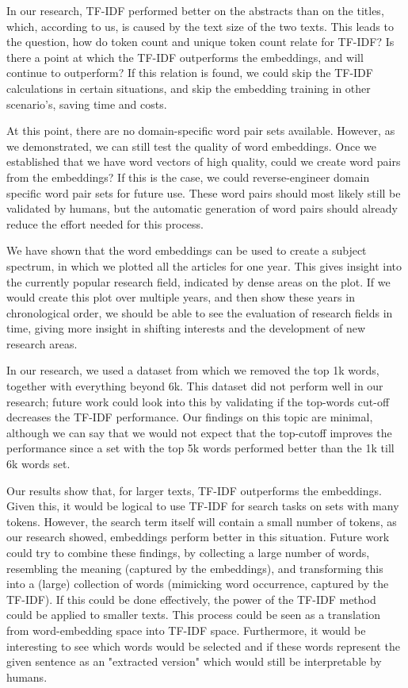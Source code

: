\documentclass[../../Thesis.tex]{subfiles}
\begin{document}
In our research, TF-IDF performed better on the abstracts than on the titles, which, according to us, is caused by the text size of the two texts. This leads to the question, how do token count and unique token count relate for TF-IDF? Is there a point at which the TF-IDF outperforms the embeddings, and will continue to outperform? If this relation is found,  we could skip the TF-IDF calculations in certain situations, and skip the embedding training in other scenario's, saving time and costs.

At this point, there are no domain-specific word pair sets available. However, as we demonstrated, we can still test the quality of word embeddings. Once we established that we have word vectors of high quality, could we create word pairs from the embeddings? If this is the case, we could reverse-engineer domain specific word pair sets for future use. These word pairs should most likely still be validated by humans, but the automatic generation of word pairs should already reduce the effort needed for this process.

We have shown that the word embeddings can be used to create a subject spectrum, in which we plotted all the articles for one year. This gives insight into the currently popular research field, indicated by dense areas on the plot. If we would create this plot over multiple years, and then show these years in chronological order, we should be able to see the evaluation of research fields in time, giving more insight in shifting interests and the development of new research areas.

In our research, we used a dataset from which we removed the top 1k words, together with everything beyond 6k. This dataset did not perform well in our research; future work could look into this by validating if the top-words cut-off decreases the TF-IDF performance. Our findings on this topic are minimal, although we can say that we would not expect that the top-cutoff improves the performance since a set with the top 5k words performed better than the 1k till 6k words set.

Our results show that, for larger texts, TF-IDF outperforms the embeddings. Given this, it would be logical to use TF-IDF for search tasks on sets with many tokens. However, the search term itself will contain a small number of tokens, as our research showed, embeddings perform better in this situation. Future work could try to combine these findings, by collecting a large number of words, resembling the meaning (captured by the embeddings), and transforming this into a (large) collection of words (mimicking word occurrence, captured by the TF-IDF). If this could be done effectively, the power of the TF-IDF method could be applied to smaller texts. This process could be seen as a translation from word-embedding space into TF-IDF space. Furthermore, it would be interesting to see which words would be selected and if these words represent the given sentence as an "extracted version" which would still be interpretable by humans.
\end{document}
